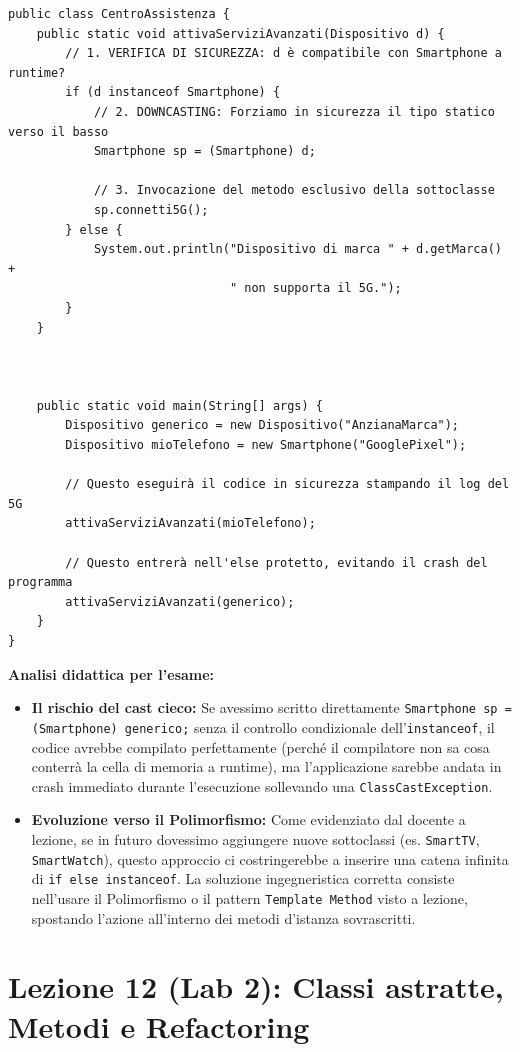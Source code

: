 \documentclass[12pt, a4paper]{article}
\begin{document}
\begin{verbatim}
public class CentroAssistenza {
    public static void attivaServiziAvanzati(Dispositivo d) {
        // 1. VERIFICA DI SICUREZZA: d è compatibile con Smartphone a runtime?
        if (d instanceof Smartphone) {
            // 2. DOWNCASTING: Forziamo in sicurezza il tipo statico verso il basso
            Smartphone sp = (Smartphone) d;
            
            // 3. Invocazione del metodo esclusivo della sottoclasse
            sp.connetti5G();
        } else {
            System.out.println("Dispositivo di marca " + d.getMarca() + 
                               " non supporta il 5G.");
        }
    }



    public static void main(String[] args) {
        Dispositivo generico = new Dispositivo("AnzianaMarca");
        Dispositivo mioTelefono = new Smartphone("GooglePixel");

        // Questo eseguirà il codice in sicurezza stampando il log del 5G
        attivaServiziAvanzati(mioTelefono);

        // Questo entrerà nell'else protetto, evitando il crash del programma
        attivaServiziAvanzati(generico);
    }
}
\end{verbatim}

\textbf{Analisi didattica per l'esame:}
\begin{itemize}
    \item \textbf{Il rischio del cast cieco:} Se avessimo scritto direttamente \texttt{Smartphone sp = (Smartphone) generico;} senza il controllo condizionale dell'\texttt{instanceof}, il codice avrebbe compilato perfettamente (perché il compilatore non sa cosa conterrà la cella di memoria a runtime), ma l'applicazione sarebbe andata in crash immediato durante l'esecuzione sollevando una \texttt{ClassCastException}.
    \item \textbf{Evoluzione verso il Polimorfismo:} Come evidenziato dal docente a lezione, se in futuro dovessimo aggiungere nuove sottoclassi (es. \texttt{SmartTV}, \texttt{SmartWatch}), questo approccio ci costringerebbe a inserire una catena infinita di \texttt{if else instanceof}. La soluzione ingegneristica corretta consiste nell'usare il Polimorfismo o il pattern \texttt{Template Method} visto a lezione, spostando l'azione all'interno dei metodi d'istanza sovrascritti.
\end{itemize}

\section{Lezione 12 (Lab 2): Classi astratte, Metodi e Refactoring}
\end{document}
